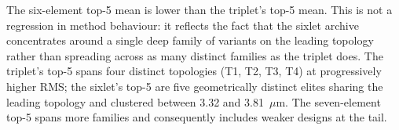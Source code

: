 The six-element top-5 mean is lower than the triplet's top-5 mean. This is not a regression in method behaviour: it reflects the fact that the sixlet archive concentrates around a single deep family of variants on the leading topology rather than spreading across as many distinct families as the triplet does. The triplet's top-5 spans four distinct topologies (T1, T2, T3, T4) at progressively higher RMS; the sixlet's top-5 are five geometrically distinct elites sharing the leading topology and clustered between 3.32 and 3.81~$\mu$m. The seven-element top-5 spans more families and consequently includes weaker designs at the tail.

